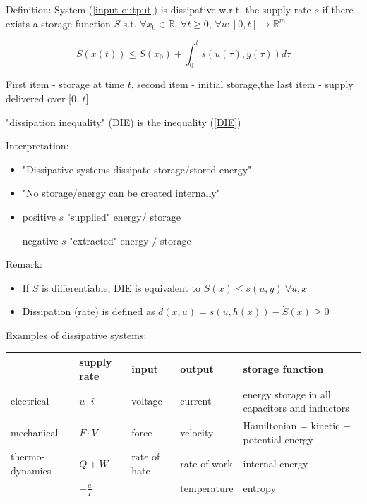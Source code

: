 Definition: System (\ref{input-output}) is dissipative w.r.t. the supply rate $s$ if there exists a storage function $S$ s.t. $\forall x_0 \in \mathbb{R}$, $\forall t \geq 0$, $\forall u : [0, t] \to \mathbb{R}^m$

\begin{equation}\label{DIE}
S(x(t)) \leq S(x_0)
 + \int_0^ts(u(\tau), y(\tau))d\tau
\end{equation}  

First item - storage at time $t$, second item - initial storage,the last item - supply delivered over [0, $t$]

"dissipation inequality" (DIE) is the inequality (\ref{DIE})

Interpretation:
\begin{itemize}
\item "Dissipative systems dissipate storage/stored energy"
\item "No storage/energy can be created internally"
\item positive $s$ "supplied" energy/ storage
     
      negative $s$ "extracted" energy / storage
\end{itemize}

Remark: 
\begin{itemize}
\item If $S$ is differentiable, DIE is equivalent to $\dot{S}(x) \leq s(u,y) \ \forall u, x$
\item Dissipation (rate) is defined as $d(x,u) = s(u,h(x)) - \dot{S}(x) \geq 0$
\end{itemize}

Examples of dissipative systems:
\begin{center}
    \begin{tabular}{| l | l | l | l | l |}
    \hline
     & supply rate & input & output & storage function  \\ \hline
    electrical & $u \cdot i$ & voltage & current & energy storage in all capacitors and inductors\\ \hline
    mechanical & $F \cdot V$ & force & velocity & Hamiltonian = kinetic + potential energy \\ \hline
    thermo-dynamics & $Q + W$ & rate of hate & rate of work & internal energy \\
    \hline
    & $-\frac{a}{T}$ & & temperature & entropy \\
    \hline
    \end{tabular}
\end{center}

